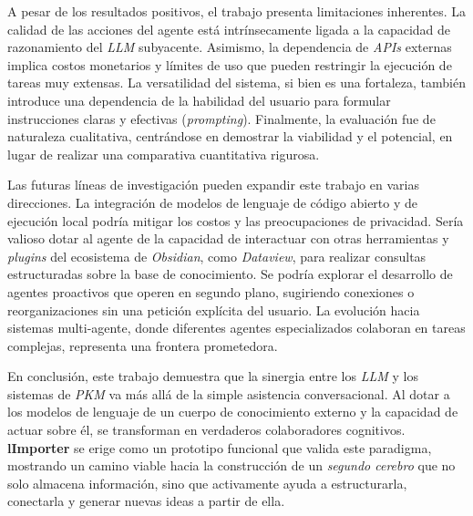 A pesar de los resultados positivos, el trabajo presenta limitaciones inherentes. La calidad de las acciones del agente está intrínsecamente ligada a la capacidad de razonamiento del \textit{LLM} subyacente. Asimismo, la dependencia de \textit{APIs} externas implica costos monetarios y límites de uso que pueden restringir la ejecución de tareas muy extensas. La versatilidad del sistema, si bien es una fortaleza, también introduce una dependencia de la habilidad del usuario para formular instrucciones claras y efectivas (\textit{prompting}). Finalmente, la evaluación fue de naturaleza cualitativa, centrándose en demostrar la viabilidad y el potencial, en lugar de realizar una comparativa cuantitativa rigurosa.

Las futuras líneas de investigación pueden expandir este trabajo en varias direcciones. La integración de modelos de lenguaje de código abierto y de ejecución local podría mitigar los costos y las preocupaciones de privacidad. Sería valioso dotar al agente de la capacidad de interactuar con otras herramientas y \textit{plugins} del ecosistema de \textit{Obsidian}, como \textit{Dataview}, para realizar consultas estructuradas sobre la base de conocimiento. Se podría explorar el desarrollo de agentes proactivos que operen en segundo plano, sugiriendo conexiones o reorganizaciones sin una petición explícita del usuario. La evolución hacia sistemas multi-agente, donde diferentes agentes especializados colaboran en tareas complejas, representa una frontera prometedora.

En conclusión, este trabajo demuestra que la sinergia entre los \textit{LLM} y los sistemas de \textit{PKM} va más allá de la simple asistencia conversacional. Al dotar a los modelos de lenguaje de un cuerpo de conocimiento externo y la capacidad de actuar sobre él, se transforman en verdaderos colaboradores cognitivos. \textbf{lImporter} se erige como un prototipo funcional que valida este paradigma, mostrando un camino viable hacia la construcción de un \textit{segundo cerebro} que no solo almacena información, sino que activamente ayuda a estructurarla, conectarla y generar nuevas ideas a partir de ella.